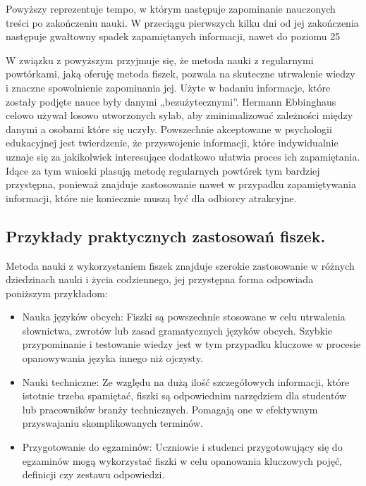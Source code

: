 Powyższy reprezentuje tempo, w którym następuje zapominanie nauczonych treści po zakończeniu nauki. W przeciągu pierwszych kilku dni od jej zakończenia następuje gwałtowny spadek zapamiętanych informacji, nawet do poziomu 25%

W związku z powyższym przyjmuje się, że metoda nauki z regularnymi powtórkami, jaką oferuję metoda fiszek, pozwala na skuteczne utrwalenie wiedzy i znaczne spowolnienie zapominania jej. Użyte w badaniu informacje, które zostały podjęte nauce były danymi „bezużytecznymi”. Hermann Ebbinghaus celowo używał losowo utworzonych sylab, aby zminimalizować zależności między danymi a osobami które się uczyły. Powszechnie akceptowane w psychologii edukacyjnej jest twierdzenie, że przyswojenie informacji, które indywidualnie uznaje się za jakikolwiek interesujące dodatkowo ułatwia proces ich zapamiętania. Idące za tym wnioski plasują metodę regularnych powtórek tym bardziej przystępna, ponieważ znajduje zastosowanie nawet w przypadku zapamiętywania informacji, które nie koniecznie muszą być dla odbiorcy atrakcyjne.

\subsection{Przykłady praktycznych zastosowań fiszek.}

Metoda nauki z wykorzystaniem fiszek znajduje szerokie zastosowanie w różnych dziedzinach nauki i życia codziennego, jej przystępna forma odpowiada poniższym przykładom:
\begin{itemize}
    \item Nauka języków obcych: Fiszki są powszechnie stosowane w celu utrwalenia słownictwa, zwrotów lub zasad gramatycznych języków obcych. Szybkie przypominanie i testowanie wiedzy jest w tym przypadku kluczowe w procesie opanowywania języka innego niż ojczysty.
    \item Nauki techniczne: Ze względu na dużą ilość szczegółowych informacji, które istotnie trzeba spamiętać, fiszki są odpowiednim narzędziem dla studentów lub pracowników branży technicznych. Pomagają one w efektywnym przyswajaniu skomplikowanych terminów.
    \item Przygotowanie do egzaminów: Uczniowie i studenci przygotowujący się do egzaminów mogą wykorzystać fiszki w celu opanowania kluczowych pojęć, definicji czy zestawu odpowiedzi.
\end{itemize}

